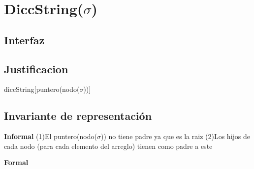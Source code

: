 \section{DiccString($\sigma$)}

\subsection{Interfaz}

\begin{Representacion}
\subsection{Justificacion}
	\begin{Estructura}{diccString}[puntero(nodo($\sigma$))]
		\begin{Tupla}[nodo]
		\end{Tupla}
	\end{Estructura}
\subsection{Invariante de representación}

\textbf{Informal}
(1)El puntero(nodo($\sigma$)) no tiene padre ya que es la raiz
(2)Los hijos de cada nodo (para cada elemento del arreglo) tienen como padre a este

\textbf{Formal}



\end{Representacion}
